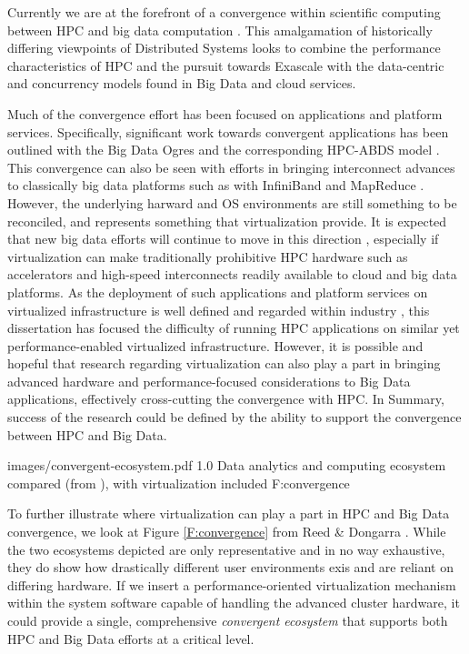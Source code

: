 Currently we are at the forefront of a convergence within scientific computing between HPC and big data computation \cite{reed2015exascale}. This amalgamation of historically differing viewpoints of Distributed Systems looks to combine the performance characteristics of HPC and the pursuit towards Exascale with the data-centric and concurrency models found in Big Data and cloud services. 

Much of the convergence effort has been focused on applications and platform services. Specifically, significant work towards convergent applications has been outlined with the Big Data Ogres \cite{Jha2014apache} and the corresponding HPC-ABDS model \cite{qiu2014towards}.  This convergence can also be seen with efforts in bringing interconnect advances to classically big data platforms such as with InfiniBand and MapReduce \cite{panda2013hadoop}. However, the underlying harward and OS environments are still something to be reconciled, and represents something that virtualization provide. It is expected that new big data efforts will continue to move in this direction \cite{ekanayake2016spidal}, especially if virtualization can make traditionally prohibitive HPC hardware such as accelerators and high-speed interconnects readily available to cloud and big data platforms. As the deployment of such applications and platform services on virtualized infrastructure is well defined and regarded within industry \cite{tian2011towards}, this dissertation has focused the difficulty of running HPC applications on similar yet performance-enabled virtualized infrastructure.  However, it is possible and hopeful that research regarding virtualization can also play a part in bringing advanced hardware and performance-focused considerations to Big Data applications, effectively cross-cutting the convergence with HPC. In Summary, success of the research could be defined by the ability to support the convergence between HPC and Big Data.

 {images/convergent-ecosystem.pdf}
 {1.0}
 {Data analytics and computing ecosystem compared (from \cite{reed2015exascale}), with virtualization included}
 {F:convergence}


To further illustrate where virtualization can play a part in HPC and Big Data convergence, we look at Figure \ref{F:convergence} from Reed \& Dongarra \cite{reed2015exascale}. While the two ecosystems depicted are only representative and in no way exhaustive, they do show how drastically different user environments exis and are reliant on differing hardware. If we insert a performance-oriented virtualization mechanism within the system software capable of handling the advanced cluster hardware, it could provide a single, comprehensive \emph{convergent ecosystem} that supports both HPC and Big Data efforts at a critical level. 



